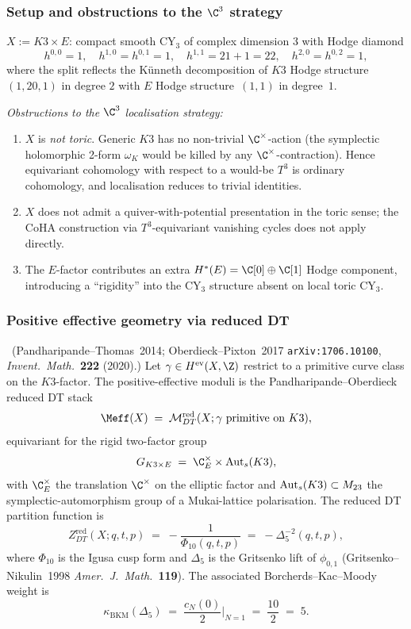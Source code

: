 \subsubsection{Setup and obstructions to the $\C^3$ strategy}
\label{w17:subsubsec:k3e-setup}

$X := K3 \times E$: compact smooth CY$_3$ of complex dimension $3$ with
Hodge diamond
\[
 h^{0, 0} = 1, \quad h^{1, 0} = h^{0, 1} = 1, \quad h^{1, 1} = 21 + 1 = 22,
 \quad h^{2, 0} = h^{0, 2} = 1,
\]
where the split reflects the K\"unneth decomposition of $K3$ Hodge
structure~$(1, 20, 1)$ in degree $2$ with $E$ Hodge structure~$(1, 1)$ in
degree~$1$.

\emph{Obstructions to the $\C^3$ localisation strategy:}
\begin{enumerate}
\item $X$ is \emph{not toric}. Generic $K3$ has no non-trivial $\C^\times$-action
(the symplectic holomorphic 2-form $\omega_K$ would be killed by any
$\C^\times$-contraction). Hence equivariant cohomology with respect to a
would-be $T^3$ is ordinary cohomology, and localisation reduces to trivial
identities.
\item $X$ does not admit a quiver-with-potential presentation in the toric
sense; the CoHA construction via $T^3$-equivariant vanishing cycles does not
apply directly.
\item The $E$-factor contributes an extra $H^*(E) = \C[0] \oplus \C[1]$ Hodge
component, introducing a ``rigidity'' into the CY$_3$ structure absent on
local toric CY$_3$.
\end{enumerate}

\subsubsection{Positive effective geometry via reduced DT}
\label{w17:subsubsec:k3e-reduced-dt}

\begin{theorem}
\label{w17:thm:k3e-reduced-dt}
\ClaimStatusProvedElsewhere\ (Pandharipande--Thomas~2014;
Oberdieck--Pixton~2017 \texttt{arXiv:1706.10100}, \emph{Invent.\ Math.}~\textbf{222}
(2020).) Let $\gamma \in H^{\mathrm{ev}}(X, \Z)$ restrict to a primitive curve
class on the $K3$-factor. The positive-effective moduli is the
Pandharipande--Oberdieck reduced DT stack
\[
 \Meff(X) \;=\; \Mred(X; \gamma\text{ primitive on }K3),
\]
equivariant for the rigid two-factor group
\[
 G_{K3 \times E} \;=\; \C^\times_E \times \Auts(K3),
\]
with $\C^\times_E$ the translation $\C^\times$ on the elliptic factor and
$\mathrm{Aut}_s(K3) \subset M_{23}$ the symplectic-automorphism group of a Mukai-lattice
polarisation. The reduced DT partition function is
\[
 Z^{\mathrm{red}}_{DT}(X; q, t, p) \;=\;
 -\frac{1}{\Phi_{10}(q, t, p)} \;=\; -\Delta_5^{-2}(q, t, p),
\]
where $\Phi_{10}$ is the Igusa cusp form and $\Delta_5$ is the Gritsenko lift of
$\phi_{0, 1}$ (Gritsenko--Nikulin~1998 \emph{Amer.\ J.\ Math.}~\textbf{119}).
The associated Borcherds--Kac--Moody weight is
\[
 \kappa_{\mathrm{BKM}}(\Delta_5) \;=\; \frac{c_N(0)}{2}\bigg|_{N = 1}
 \;=\; \frac{10}{2} \;=\; 5.
\]
\end{theorem}


